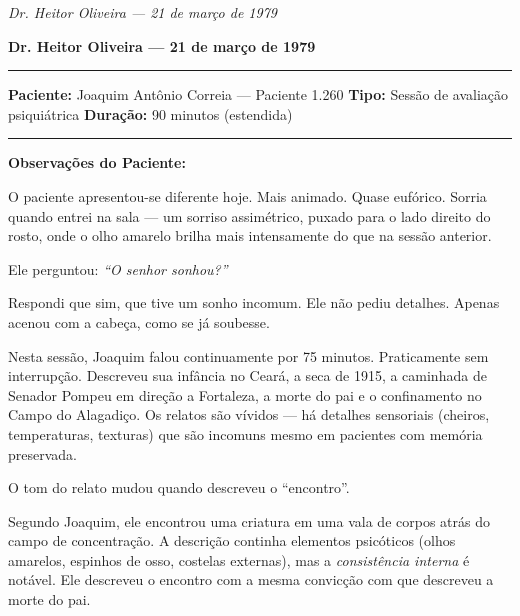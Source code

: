 
\noindent \textit{Dr. Heitor Oliveira --- 21 de março de 1979}

\noindent \textbf{Dr. Heitor Oliveira --- 21 de março de 1979}

\vspace{0.5em}\noindent\rule{\textwidth}{0.5pt}\vspace{0.5em}

\noindent \textbf{Paciente:} Joaquim Antônio Correia --- Paciente 1.260
\textbf{Tipo:} Sessão de avaliação psiquiátrica
\textbf{Duração:} 90 minutos (estendida)

\vspace{0.5em}\noindent\rule{\textwidth}{0.5pt}\vspace{0.5em}

\noindent \textbf{Observações do Paciente:}

\noindent O paciente apresentou-se diferente hoje. Mais animado. Quase eufórico. Sorria quando entrei na sala --- um sorriso assimétrico, puxado para o lado direito do rosto, onde o olho amarelo brilha mais intensamente do que na sessão anterior.

\noindent Ele perguntou: \textit{\textquotedblleft{}O senhor sonhou?\textquotedblright{}}

\noindent Respondi que sim, que tive um sonho incomum. Ele não pediu detalhes. Apenas acenou com a cabeça, como se já soubesse.

\noindent Nesta sessão, Joaquim falou continuamente por 75 minutos. Praticamente sem interrupção. Descreveu sua infância no Ceará, a seca de 1915, a caminhada de Senador Pompeu em direção a Fortaleza, a morte do pai e o confinamento no Campo do Alagadiço. Os relatos são vívidos --- há detalhes sensoriais (cheiros, temperaturas, texturas) que são incomuns mesmo em pacientes com memória preservada.

\noindent O tom do relato mudou quando descreveu o \textquotedblleft{}encontro\textquotedblright{}.

\noindent Segundo Joaquim, ele encontrou uma criatura em uma vala de corpos atrás do campo de concentração. A descrição continha elementos psicóticos (olhos amarelos, espinhos de osso, costelas externas), mas a \textit{consistência interna} é notável. Ele descreveu o encontro com a mesma convicção com que descreveu a morte do pai.

